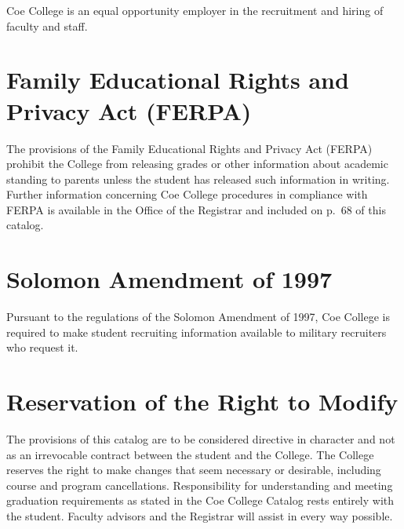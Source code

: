 \documentclass[
  letterpaper,
]{scrbook}
\renewcommand{\part}[1]{\addcontentsline{toc}{part}{#1}}
\begin{document}

Coe College is an equal opportunity employer in the recruitment and
hiring of faculty and staff.

\section*{Family Educational Rights and Privacy Act
(FERPA)}\label{family-educational-rights-and-privacy-act-ferpa}


The provisions of the Family Educational Rights and Privacy Act (FERPA)
prohibit the College from releasing grades or other information about
academic standing to parents unless the student has released such
information in writing. Further information concerning Coe College
procedures in compliance with FERPA is available in the Office of the
Registrar and included on p.~68 of this catalog.

\section*{Solomon Amendment of 1997}\label{solomon-amendment-of-1997}


Pursuant to the regulations of the Solomon Amendment of 1997, Coe
College is required to make student recruiting information available to
military recruiters who request it.

\section*{Reservation of the Right to
Modify}\label{reservation-of-the-right-to-modify}


The provisions of this catalog are to be considered directive in
character and not as an irrevocable contract between the student and the
College. The College reserves the right to make changes that seem
necessary or desirable, including course and program cancellations.
Responsibility for understanding and meeting graduation requirements as
stated in the Coe College Catalog rests entirely with the student.
Faculty advisors and the Registrar will assist in every way possible.

\part{INTRODUCTORY RESOURCES}
\end{document}
